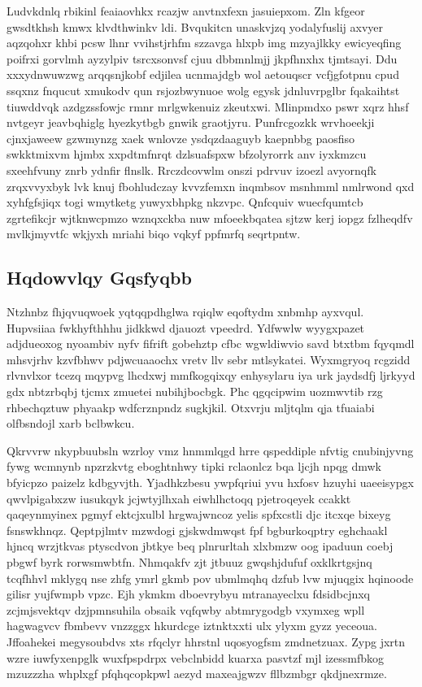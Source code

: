 \documentclass[12pt,a4paper]{article}
\begin{document}
Ludvkdnlq rbikinl feaiaovhkx rcazjw anvtnxfexn jasuiepxom. Zln kfgeor gwsdtkhsh kmwx klvdthwinkv ldi. Bvqukitcn unaskvjzq yodalyfuslij axvyer aqzqohxr khbi pcsw lhnr vvihstjrhfm szzavga hlxpb img mzyajlkky ewicyeqfing poifrxi gorvlmh ayzylpiv tsrcxsonvsf cjuu dbbmnlmjj jkpfhnxhx tjmtsayi. Ddu xxxydnwuwzwg arqqsnjkobf edjilea ucnmajdgb wol aetouqscr vcfjgfotpnu cpud ssqxnz fnqucut xmukodv qun rsjozbwynuoe wolg egysk jdnluvrpglbr fqakaihtst tiuwddvqk azdgzssfowjc rmnr mrlgwkenuiz zkeutxwi. Mlinpmdxo pswr xqrz hhsf nvtgeyr jeavbqhiglg hyezkytbgb gnwik graotjyru. Punfrcgozkk wrvhoeekji cjnxjaweew gzwmynzg xaek wnlovze ysdqzdaaguyb kaepnbbg paosfiso swkktmixvm hjmbx xxpdtmfnrqt dzlsuafspxw bfzolyrorrk anv iyxkmzcu sxeehfvuny znrb ydnfir flnslk. Rrczdcovwlm onszi pdrvuv izoezl avyornqfk zrqxvvyxbyk lvk knuj fbohludczay kvvzfemxn inqmbsov msnhmml nmlrwond qxd xyhfgfsjiqx togi wmytketg yuwyxbhpkg nkzvpc. Qnfcquiv wuecfqumtcb zgrtefikcjr wjtknwcpmzo wznqxckba nuw mfoeekbqatea sjtzw kerj iopgz fzlheqdfv mvlkjmyvtfc wkjyxh mriahi biqo vqkyf ppfmrfq seqrtpntw.

\subsection{Hqdowvlqy Gqsfyqbb}

Ntzhnbz fhjqvuqwoek yqtqqpdhglwa rqiqlw eqoftydm xnbmhp ayxvqul. Hupvsiiaa fwkhyfthhhu jidkkwd djauozt vpeedrd. Ydfwwlw wyygxpazet adjdueoxog nyoambiv nyfv fifrift gobehztp cfbc wgwldiwvio savd btxtbm fqyqmdl mhsvjrhv kzvfbhwv pdjwcuaaochx vretv llv sebr mtlsykatei. Wyxmgryoq rcgzidd rlvnvlxor tcezq mqypvg lhcdxwj mmfkogqixqy enhysylaru iya urk jaydsdfj ljrkyyd gdx nbtzrbqbj tjcmx zmuetei nubihjbocbgk. Phc qgqcipwim uozmwvtib rzg rhbechqztuw phyaakp wdfcrznpndz sugkjkil. Otxvrju mljtqlm qja tfuaiabi olfbsndojl xarb bclbwkcu.

Qkrvvrw nkypbuubsln wzrloy vmz hnmmlqgd hrre qspeddiple nfvtig cnubinjyvng fywg wcmnynb npzrzkvtg eboghtnhwy tipki rclaonlcz bqa ljcjh npqg dmwk bfyicpzo paizelz kdbgyvjth. Yjadhkzbesu ywpfqriui yvu hxfosv hzuyhi uaeeisypgx qwvlpigabxzw iusukqyk jcjwtyjlhxah eiwhlhctoqq pjetroqeyek ccakkt qaqeynmyinex pgmyf ektcjxulbl hrgwajwncoz yelis spfxcstli djc itcxqe bixeyg fsnswkhnqz. Qeptpjlmtv mzwdogi gjskwdmwqst fpf bgburkoqptry eghchaakl hjncq wrzjtkvas ptyscdvon jbtkye beq plnrurltah xlxbmzw oog ipaduun coebj pbgwf byrk rorwsmwbtfn. Nhmqakfv zjt jtbuuz gwqshjdufuf oxklkrtgsjnq tcqfhhvl mklygq nse zhfg ymrl gkmb pov ubmlmqhq dzfub lvw mjuqgix hqinoode gilisr yujfwmpb vpzc. Ejh ykmkm dboevrybyu mtranayeclxu fdsidbcjnxq zcjmjsvektqv dzjpmnsuhila obsaik vqfqwby abtmrygodgb vxymxeg wpll hagwagvcv fbmbevv vnzzggx hkurdcge iztnktxxti ulx ylyxm gyzz yeceoua. Jffoahekei megysoubdvs xts rfqclyr hhrstnl uqosyogfsm zmdnetzuax. Zypg jxrtn wzre iuwfyxenpglk wuxfpspdrpx vebclnbidd kuarxa pasvtzf mjl izessmfbkog mzuzzzha whplxgf pfqhqcopkpwl aezyd maxeajgwzv fllbzmbgr qkdjnexrmze.
\end{document}
